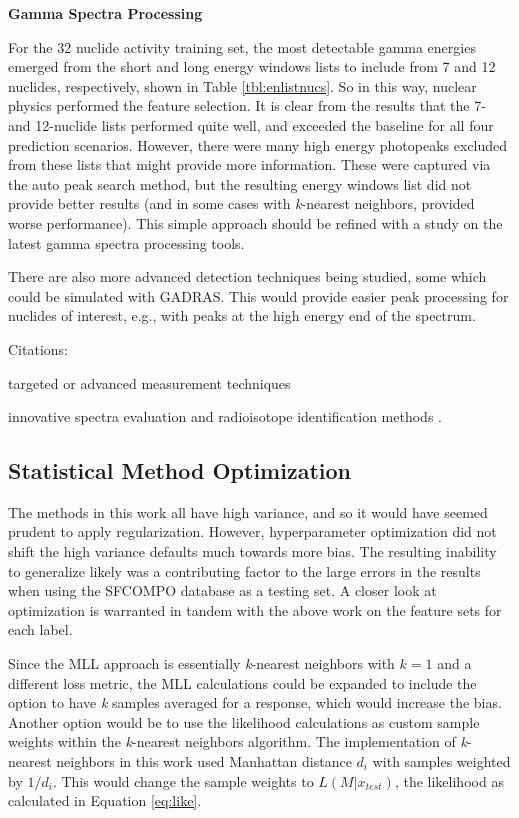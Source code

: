 \noindent \textbf{Gamma Spectra Processing}

For the 32 nuclide activity training set, the most detectable gamma energies
emerged from the short and long energy windows lists to include from 7 and 12
nuclides, respectively, shown in Table \ref{tbl:enlistnucs}. So in this way,
nuclear physics performed the feature selection.  It is clear from the results
that the 7- and 12-nuclide lists performed quite well, and exceeded the
baseline for all four prediction scenarios.  However, there were many high
energy photopeaks excluded from these lists that might provide more
information. These were captured via the auto peak search method, but the
resulting energy windows list did not provide better results (and in some cases
with \textit{k}-nearest neighbors, provided worse performance).  This simple
approach should be refined with a study on the latest gamma spectra
processing tools. 

There are also more advanced detection techniques being studied, some which
could be simulated with \gls{GADRAS}.  This would provide easier peak
processing for nuclides of interest, e.g., with peaks at the high energy end of
the spectrum. 

Citations:

targeted or advanced measurement techniques \cite{snf_gamma, compton_supp,
bwr_high-res_gamma, pwr_bwr_gamma}

innovative spectra evaluation and radioisotope identification methods
\cite{riid_09, rapid_riid_18, sull_gen_07, sull_valid_15, sull_auto_17,
sull_unc_17}.

\subsection{Statistical Method Optimization}

The methods in this work all have high variance, and so it would have seemed
prudent to apply regularization. However, hyperparameter optimization did not
shift the high variance defaults much towards more bias.  The resulting
inability to generalize likely was a contributing factor to the large errors in
the results when using the \gls{SFCOMPO} database as a testing set. A closer
look at optimization is warranted in tandem with the above work on the feature
sets for each label.

Since the \gls{MLL} approach is essentially \textit{k}-nearest neighbors with
$k=1$ and a different loss metric, the \gls{MLL} calculations could be expanded
to include the option to have \textit{k} samples averaged for a response, which
would increase the bias.  Another option would be to use the likelihood
calculations as custom sample weights within the \textit{k}-nearest neighbors
algorithm. The implementation of \textit{k}-nearest neighbors in this work used
Manhattan distance $d_i$ with samples weighted by $1/d_i$. This would change
the sample weights to $L(M|x_{test})$, the likelihood as calculated in Equation
\ref{eq:like}.

